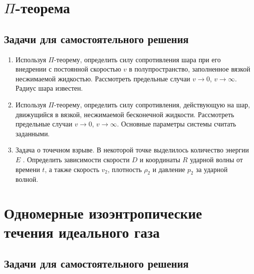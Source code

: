 \documentclass[a4paper, 14pt]{extarticle}
\begin{document}
\section{$\Pi$-теорема}

\subsection{Задачи для самостоятельного решения}

\begin{enumerate}
	
	\item Используя $\Pi$-теорему, определить силу сопротивления шара при его внедрении с постоянной скоростью $v$ в полупространство, заполненное вязкой несжимаемой жидкостью. Рассмотреть предельные случаи $v \to 0$, $v \to \infty$. Радиус шара известен.
	
	\item
	Используя  $\Pi$-теорему, определить силу сопротивления, действующую на шар, движущийся в вязкой, несжимаемой бесконечной жидкости. Рассмотреть предельные случаи $v \to 0$, $v \to \infty$. Основные параметры системы считать заданными.
	
	\item
	Задача о точечном взрыве. В некоторой точке выделилось количество энергии $E$ . Определить зависимости скорости $D$ и координаты $R$ ударной волны от времени $t$, а также скорость $v_2$, плотность $\rho_2$ и давление $p_2$ за ударной волной. 

\end{enumerate}

\section{Одномерные изоэнтропические течения идеального газа }

\subsection{Задачи для самостоятельного решения}
\end{document}
